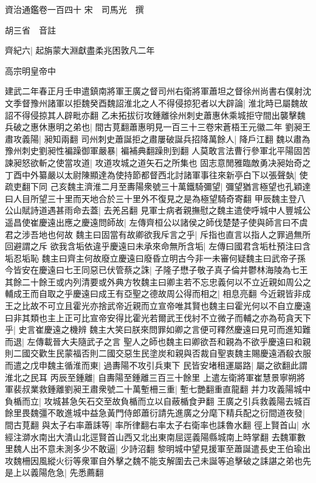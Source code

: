 資治通鑑卷一百四十
宋　司馬光　撰

胡三省　音註

齊紀六|{
	起旃蒙大淵獻盡柔兆困敦凡二年}


高宗明皇帝中

建武二年春正月壬申遣鎮南將軍王廣之督司州右衛將軍蕭坦之督徐州尚書右僕射沈文季督豫州諸軍以拒魏癸酉魏詔淮北之人不得侵掠犯者以大辟論|{
	淮北時已屬魏故詔不得侵掠其人辟毗亦翻}
乙未拓拔衍攻鍾離徐州刺史蕭惠休乘城拒守間出襲擊魏兵破之惠休惠明之弟也|{
	間古莧翻蕭惠明見一百三十三卷宋蒼梧王元徽二年}
劉昶王肅攻義陽|{
	昶知兩翻}
司州刺史蕭誕拒之肅屢破誕兵招降萬餘人|{
	降戶江翻}
魏以肅為豫州刺史劉昶性褊躁御軍嚴暴|{
	褊補典翻躁則到翻}
人莫敢言法曹行參軍北平陽固苦諫昶怒欲斬之使當攻道|{
	攻道攻城之道矢石之所集也}
固志意閒雅臨敵勇决昶始奇之丁酉中外纂嚴以太尉陳顯達為使持節都督西北討諸軍事往來新亭白下以張聲埶|{
	使疏吏翻下同}
己亥魏主濟淮二月至夀陽衆號三十萬鐵騎彌望|{
	彌望猶言極望也孔穎達曰人目所望三十里而天地合於三十里外不復見之是為極望騎奇寄翻}
甲辰魏主登八公山賦詩道遇甚雨命去蓋|{
	去羌呂翻}
見軍士病者親撫慰之魏主遣使呼城中人豐城公遥昌使崔慶遠出應之慶遠問師故|{
	左傳齊桓公以諸侯之師伐楚楚子使與師言曰不虞君之涉吾地也何故}
魏主曰固當有故卿欲我斥言之乎|{
	斥指也直言以指人之罪過無所回避謂之斥}
欲我含垢依違乎慶遠曰未承來命無所含垢|{
	左傳曰國君含垢杜預注曰含垢忍垢恥}
魏主曰齊主何故廢立慶遠曰廢昏立明古今非一未審何疑魏主曰武帝子孫今皆安在慶遠曰七王同惡已伏管蔡之誅|{
	子隆子懋子敬子真子倫并鬱林海陵為七王}
其餘二十餘王或内列清要或外典方牧魏主曰卿主若不忘忠義何以不立近親如周公之輔成王而自取之乎慶遠曰成王有亞聖之德故周公得而相之|{
	相息亮翻}
今近親皆非成王之比故不可立且霍光亦捨武帝近親而立宣帝唯其賢也魏主曰霍光何以不自立慶遠曰非其類也主上正可比宣帝安得比霍光若爾武王伐紂不立微子而輔之亦為苟貪天下乎|{
	史言崔慶遠之機辨}
魏主大笑曰朕來問罪如卿之言便可釋然慶遠曰見可而進知難而退|{
	左傳載晉大夫隨武子之言}
聖人之師也魏主曰卿欲吾和親為不欲乎慶遠曰和親則二國交歡生民蒙福否則二國交惡生民塗炭和親與否裁自聖衷魏主賜慶遠酒殽衣服而遣之戊申魏主循淮而東|{
	過夀陽不攻引兵東下}
民皆安堵租運屬路|{
	屬之欲翻此謂淮北之民耳}
丙辰至鍾離|{
	自夀陽至鍾離三百三十餘里}
上遣左衛將軍崔慧景寧朔將軍裴叔業救鍾離劉昶王肅衆號二十萬塹柵三重|{
	塹七艷翻重直龍翻}
并力攻義陽城中負楯而立|{
	攻城甚急矢石交至故負楯而立以自蔽楯食尹翻}
王廣之引兵救義陽去城百餘里畏魏彊不敢進城中益急黃門侍郎蕭衍請先進廣之分麾下精兵配之衍間道夜發|{
	間古莧翻}
與太子右率蕭誄等|{
	率所律翻右率太子右衛率也誄魯水翻}
徑上賢首山|{
	水經注溮水南出大潰山北逕賢首山西又北出東南屈逕義陽縣城南上時掌翻}
去魏軍數里魏人出不意未測多少不敢逼|{
	少詩沼翻}
黎明城中望見援軍至蕭誕遣長史王伯瑜出攻魏柵因風縱火衍等衆軍自外擊之魏不能支解圍去己未誕等追擊破之誄諶之弟也先是上以義陽危急|{
	先悉薦翻}
